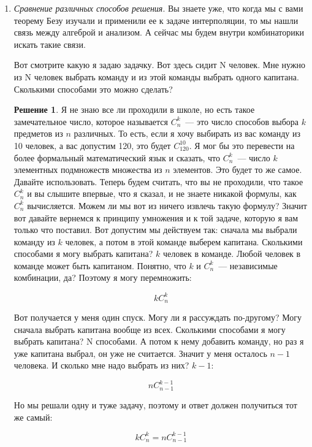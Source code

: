 \documentclass[russian]{lecture-notes}
\theoremstyle{definition}
\newtheorem*{solution}{Решение}
\begin{document}
\begin{enumerate}
	
		\item \emph{Сравнение различных способов решения}. Вы знаете уже, что когда мы с вами теорему Безу изучали и применили ее к задаче интерполяции, то мы нашли связь между алгеброй и анализом. А сейчас мы будем внутри комбинаторики искать такие связи.
		
		\begin{problem}
			Вот смотрите какую я задаю задачку. Вот здесь сидит N человек. Мне нужно из N человек выбрать команду и из этой команды выбрать одного капитана. Сколькими способами это можно сделать?
		\end{problem}
	
		\begin{solution}
			 Я не знаю все ли проходили в школе, но есть такое замечательное число, которое называется $C_n^k$~--- это число способов выбора $k$ предметов из $n$ различных. То есть, если я хочу выбирать из вас команду из 10 человек, а вас допустим 120, это будет $C_{120}^{10}$. Я мог бы это перевести на более формальный математический язык и сказать, что $C_n^k$~--- число $k$ элементных подмножеств множества из $n$ элементов. Это будет то же самое. Давайте использовать. Теперь будем считать, что вы не проходили, что такое $C_n^k$ и вы слышите впервые, что я сказал, и не знаете никакой формулы, как $C_n^k$ вычисляется. Можем ли мы вот из ничего извлечь такую формулу? Значит вот давайте вернемся к принципу умножения и к той задаче, которую я вам только что поставил. Вот допустим мы действуем так: сначала мы выбрали команду из $k$ человек, а потом в этой команде выберем капитана. Сколькими способами я могу выбрать капитана? $k$ человек в команде. Любой человек в команде может быть капитаном. Понятно, что $k$ и $C_n^k$~--- независимые комбинации, да? Поэтому я могу перемножить:
			 
			 \[
			 	kC_n^k
			 \]
			 
			 Вот получается у меня один спуск. Могу ли я рассуждать по-другому? Могу сначала выбрать капитана вообще из всех. Сколькими способами я могу выбрать капитана? N способами. А потом к нему добавить команду, но раз я уже капитана выбрал, он уже не считается. Значит у меня осталось $n-1$ человека. И сколько мне надо выбрать из них? $k-1$:
			 
			 \[
			 	nC_{n-1}^{k-1}
			 \]
			 
			 Но мы решали одну и туже задачу, поэтому и ответ должен получиться тот же самый:
			 
			 \[
			 	kC_n^k = nC_{n-1}^{k-1}
			 \]
			 

\end{solution}
\end{enumerate}
\end{document}
